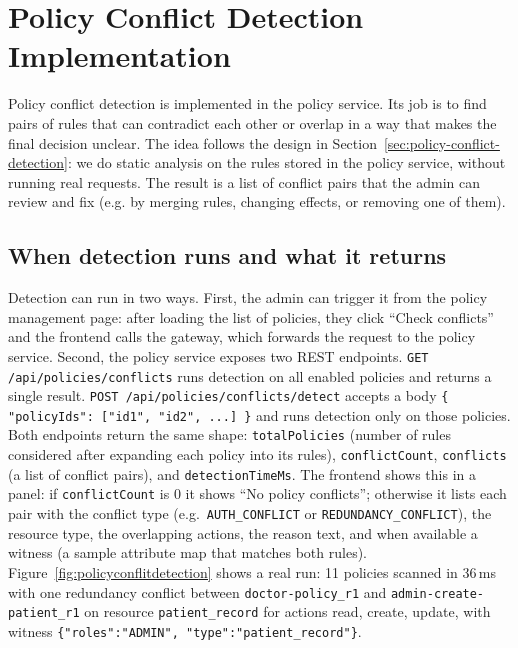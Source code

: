 \section{Policy Conflict Detection Implementation}
\label{sec:policy-conflict-detection-2}

Policy conflict detection is implemented in the policy service. Its job is to find pairs of rules that can contradict each other or overlap in a way that makes the final decision unclear. The idea follows the design in Section~\ref{sec:policy-conflict-detection}: we do static analysis on the rules stored in the policy service, without running real requests. The result is a list of conflict pairs that the admin can review and fix (e.g. by merging rules, changing effects, or removing one of them).


\subsection{When detection runs and what it returns}

Detection can run in two ways. First, the admin can trigger it from the policy management page: after loading the list of policies, they click ``Check conflicts'' and the frontend calls the gateway, which forwards the request to the policy service. Second, the policy service exposes two REST endpoints. \texttt{GET /api/policies/conflicts} runs detection on all enabled policies and returns a single result. \texttt{POST /api/policies/conflicts/detect} accepts a body \texttt{\{ "policyIds": ["id1", "id2", ...] \}} and runs detection only on those policies. Both endpoints return the same shape: \texttt{totalPolicies} (number of rules considered after expanding each policy into its rules), \texttt{conflictCount}, \texttt{conflicts} (a list of conflict pairs), and \texttt{detectionTimeMs}. The frontend shows this in a panel: if \texttt{conflictCount} is 0 it shows ``No policy conflicts''; otherwise it lists each pair with the conflict type (e.g.\ \texttt{AUTH\_CONFLICT} or \texttt{REDUNDANCY\_CONFLICT}), the resource type, the overlapping actions, the reason text, and when available a witness (a sample attribute map that matches both rules). Figure~\ref{fig:policyconflitdetection} shows a real run: 11 policies scanned in 36\,ms with one redundancy conflict between \texttt{doctor-policy\_r1} and \texttt{admin-create-patient\_r1} on resource \texttt{patient\_record} for actions read, create, update, with witness \texttt{\{"roles":"ADMIN", "type":"patient\_record"\}}. 


